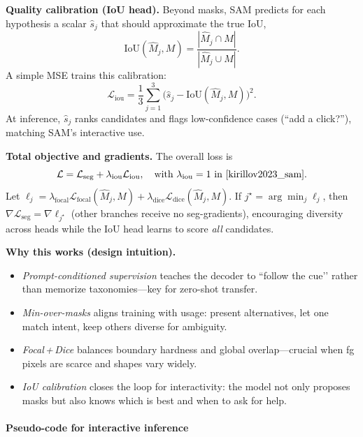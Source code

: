 \begin{enrichment}
\begin{enrichment}
		\medskip
		\noindent\textbf{Quality calibration (IoU head).}
		Beyond masks, SAM predicts for each hypothesis a scalar \(\hat{s}_j\) that should approximate the true IoU,
		\[
		\mathrm{IoU}(\hat{M}_j,M)=\frac{|\hat{M}_j\cap M|}{|\hat{M}_j\cup M|}.
		\]
		A simple MSE trains this calibration:
		\[
		\mathcal{L}_{\text{iou}}=\frac{1}{3}\sum_{j=1}^{3}\big(\hat{s}_j-\mathrm{IoU}(\hat{M}_j,M)\big)^2.
		\]
		At inference, \(\hat{s}_j\) ranks candidates and flags low-confidence cases (“add a click?”), matching SAM’s interactive use.
		
		\medskip
		\noindent\textbf{Total objective and gradients.}
		The overall loss is
		\[
		\mathcal{L}
		= \mathcal{L}_{\text{seg}} + \lambda_{\text{iou}}\mathcal{L}_{\text{iou}},
		\quad \text{with }\lambda_{\text{iou}}=1 \text{ in~\cite{kirillov2023_sam}}.
		\]
		Let \(\ell_j=\lambda_{\text{focal}}\mathcal{L}_{\text{focal}}(\hat{M}_j,M)+\lambda_{\text{dice}}\mathcal{L}_{\text{dice}}(\hat{M}_j,M)\).
		If \(j^\star=\arg\min_j \ell_j\), then
		\(\nabla \mathcal{L}_{\text{seg}}=\nabla \ell_{j^\star}\) (other branches receive no seg-gradients),
		encouraging diversity across heads while the IoU head learns to score \emph{all} candidates.
		
		\medskip
		\noindent\textbf{Why this works (design intuition).}
		\begin{itemize}
			\item \emph{Prompt-conditioned supervision} teaches the decoder to “follow the cue’’ rather than memorize taxonomies—key for zero-shot transfer.
			\item \emph{Min-over-masks} aligns training with usage: present alternatives, let one match intent, keep others diverse for ambiguity.
			\item \emph{Focal\,+\,Dice} balances boundary hardness and global overlap—crucial when fg pixels are scarce and shapes vary widely.
			\item \emph{IoU calibration} closes the loop for interactivity: the model not only proposes masks but also knows which is best and when to ask for help.
		\end{itemize}
		
		\paragraph{Pseudo-code for interactive inference}
		

\end{enrichment}
\end{enrichment}
